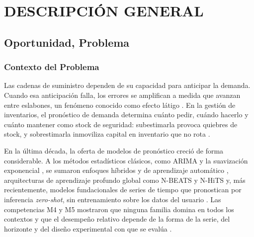 \setcounter{subsection}{0}
\section{DESCRIPCIÓN GENERAL}

\subsection{Oportunidad, Problema}


\subsubsection{Contexto del Problema}
Las cadenas de suministro dependen de su capacidad para anticipar la demanda. Cuando esa anticipación falla, los errores se amplifican a medida que avanzan entre eslabones, un fenómeno conocido como efecto látigo \cite{lee1997,chopra}. En la gestión de inventarios, el pronóstico de demanda determina cuánto pedir, cuándo hacerlo y cuánto mantener como stock de seguridad: subestimarla provoca quiebres de stock, y sobrestimarla inmoviliza capital en inventario que no rota \cite{chopra,raghuram}.

En la última década, la oferta de modelos de pronóstico creció de forma considerable. A los métodos estadísticos clásicos, como ARIMA y la suavización exponencial \cite{hyndman}, se sumaron enfoques híbridos y de aprendizaje automático \cite{quinones,lingkon}, arquitecturas de aprendizaje profundo global como N-BEATS y N-HiTS \cite{nbeats,challu} y, más recientemente, modelos fundacionales de series de tiempo que pronostican por inferencia \textit{zero-shot}, sin entrenamiento sobre los datos del usuario \cite{das,chronos}. Las competencias M4 y M5 mostraron que ninguna familia domina en todos los contextos y que el desempeño relativo depende de la forma de la serie, del horizonte y del diseño experimental con que se evalúa \cite{m4,m5}.

